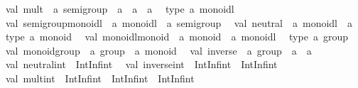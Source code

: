 \begin{isabellebody}
\begin{isamarkuptext}
\ \ val\ mult\ {}\ {}a\ semigroup\ {}{}\ {}a\ {}{}\ {}a\ {}{}\ {}a\isanewline
\ \ type\ {}a\ monoidl\isanewline
\ \ val\ semigroup{}monoidl\ {}\ {}a\ monoidl\ {}{}\ {}a\ semigroup\isanewline
\ \ val\ neutral\ {}\ {}a\ monoidl\ {}{}\ {}a\isanewline
\ \ type\ {}a\ monoid\isanewline
\ \ val\ monoidl{}monoid\ {}\ {}a\ monoid\ {}{}\ {}a\ monoidl\isanewline
\ \ type\ {}a\ group\isanewline
\ \ val\ monoid{}group\ {}\ {}a\ group\ {}{}\ {}a\ monoid\isanewline
\ \ val\ inverse\ {}\ {}a\ group\ {}{}\ {}a\ {}{}\ {}a\isanewline
\ \ val\ neutral{}int\ {}\ IntInf{}int\isanewline
\ \ val\ inverse{}int\ {}\ IntInf{}int\ {}{}\ IntInf{}int\isanewline
\ \ val\ mult{}int\ {}\ IntInf{}int\ {}{}\ IntInf{}int\ {}{}\ IntInf{}int\isanewline

\end{isamarkuptext}
\end{isabellebody}
